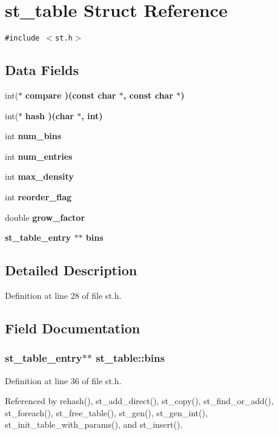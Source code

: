 \section{st\_\-table Struct Reference}
\label{structst__table}
{\tt \#include $<$st.h$>$}

\subsection*{Data Fields}
\begin{CompactItemize}
\item 
int($\ast$ \bf{compare} )(const char $\ast$, const char $\ast$)
\item 
int($\ast$ \bf{hash} )(char $\ast$, int)
\item 
int \bf{num\_\-bins}
\item 
int \bf{num\_\-entries}
\item 
int \bf{max\_\-density}
\item 
int \bf{reorder\_\-flag}
\item 
double \bf{grow\_\-factor}
\item 
\bf{st\_\-table\_\-entry} $\ast$$\ast$ \bf{bins}
\end{CompactItemize}


\subsection{Detailed Description}




Definition at line 28 of file st.h.

\subsection{Field Documentation}
\subsubsection{\setlength{\rightskip}{0pt plus 5cm}\bf{st\_\-table\_\-entry}$\ast$$\ast$ \bf{st\_\-table::bins}}\label{structst__table_8924d9633a796c5e6c03925c5344c1ad}




Definition at line 36 of file st.h.

Referenced by rehash(), st\_\-add\_\-direct(), st\_\-copy(), st\_\-find\_\-or\_\-add(), st\_\-foreach(), st\_\-free\_\-table(), st\_\-gen(), st\_\-gen\_\-int(), st\_\-init\_\-table\_\-with\_\-params(), and st\_\-insert().
